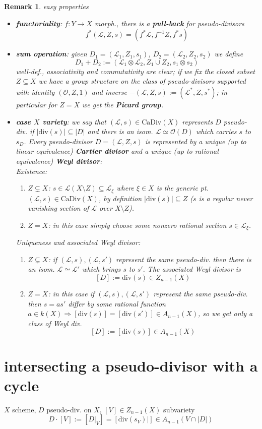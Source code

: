 \documentclass[oneside,a4paper,11pt]{amsbook}
\theoremstyle{pl}
\theoremstyle{df}
\theoremstyle{rm}
\newtheorem{rmk}{Remark}[chapter]
\newcommand{\pa}[1]{
\left(#1\right)
}
\newcommand{\qa}[1]{
\left[#1\right]
}
\newcommand{\mc}[1]{
\mathcal{#1}
}
\newcommand{\dv}[1]{
\text{div}\pa{#1}
}
\begin{document}
\begin{rmk}
easy properties
\begin{itemize}
\item{\textbf{functoriality}: $f:Y\rightarrow X$ morph., there is a \textbf{pull-back} for pseudo-divisors
\[
f^*\pa{\mc{L},Z,s}=\pa{f^*\mc{L},f^{-1}Z,f^*s} 
\]
}
\item{\textbf{sum operation}: given $D_1=\pa{\mc{L}_1,Z_1,s_1}$, $D_2=\pa{\mc{L}_2,Z_2,s_2}$ we define
\[
 D_1+D_2:=\pa{\mc{L}_1\otimes\mc{L}_2,Z_1\cup Z_2,s_1\otimes s_2}
\]
well-def., associativity and commutativity are clear; if we fix the closed subset $Z\subseteq X$ we have a group structure on the class of pseudo-divisors supported with identity $\pa{\mc{O},Z,1}$ and inverse $-\pa{\mc{L},Z,s}:=\pa{\mc{L}^*,Z,s^*}$; in particular for $Z=X$ we get the \textbf{Picard group}.}
\item{\textbf{case $X$ variety}: we say that $\pa{\mc{L},s}\in\text{CaDiv}(X)$ \emph{represents} $D$ pseudo-div. if $|\dv{s}|\subseteq |D|$ and there is an isom. $\mc{L}\simeq\mc{O}(D)$ which carries $s$ to $s_D$. Every pseudo-divisor $D=\pa{\mc{L},Z,s}$ is represented by a unique (up to linear equivalence) \textbf{Cartier divisor} and a unique (up to rational equivalence) \textbf{Weyl divisor}:\\
Existence:
\begin{enumerate}
 \item{$Z\subsetneq X$: $s\in\mc{L}(X\setminus Z)\subseteq\mc{L}_\xi$ where $\xi\in X$ is the generic pt. $\pa{\mc{L},s}\in\text{CaDiv}(X)$, by definition $|\dv{s}|\subseteq Z$ ($s$ is a regular never vanishing section of $\mc{L}$ over $X\setminus Z$).}
 \item{$Z=X$: in this case simply choose some nonzero rational section $s\in\mc{L}_\xi$.}
\end{enumerate}
Uniqueness and associated Weyl divisor:
\begin{enumerate}
 \item{$Z\subsetneq X$: if $\pa{\mc{L},s},\pa{\mc{L},s'}$ represent the same pseudo-div. then there is an isom. $\mc{L}\simeq\mc{L}'$ which brings $s$ to $s'$. The associated Weyl divisor is 
 \[
  [D]:=\dv{s}\in Z_{n-1}(X)
 \]
 }
 \item{$Z=X$: in this case if $\pa{\mc{L},s},\pa{\mc{L},s'}$ represent the same pseudo-div. then $s=as'$ differ by some rational function $a\in k(X)\Rightarrow\qa{\dv{s}}=\qa{\dv{s'}}\in A_{n-1}(X)$, so we get only a class of Weyl div. 
 \[
  [D]:=[\dv{s}]\in A_{n-1}(X)
 \]
 }
\end{enumerate}
}
\end{itemize}
\end{rmk}

\section{intersecting a pseudo-divisor with a cycle}
$X$ scheme, $D$ pseudo-div. on $X$, $[V]\in Z_{n-1}(X)$ subvariety
\[
D\cdot[V]:=[D|_V]=[\dv{s_V}|]\in A_{n-1}(V\cap |D|) 
\]
\end{document}
